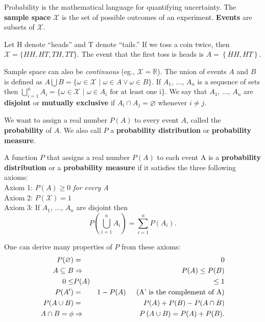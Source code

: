 Probability is the mathematical language for quantifying uncertainty. The {\bf sample space} $\mathcal{X}$ is the set of possible outcomes of an experiment. {\bf Events} are subsets of $\mathcal{X}$.

\begin{example}
 Let H denote ``heads'' and T denote ``tails.'' If we toss a coin twice, then $\mathcal{X}=\{ HH, HT, TH, TT\}$. The event that the first toss is heads is $A= \left\{HH, HT \right\}$.
\end{example}

Sample space can also be {\em continuous} (eg., $\mathcal{X}= \mathbb{R}$). The union of events $A$ and $B$ is defined as $A \bigcup B = \{ \omega \in \mathcal{X}\,\,|\,\, \omega \in A \vee \omega \in B\}$. If $A_1$, $\ldots$, $A_n$  is a sequence of sets then $\bigcup\limits_{i=1}^{n}A_{i} = \{ \omega \in \mathcal{X}\,\,|\,\, \omega \in A_{i} \text{ for at least one i}\}$. We say that  $A_1$, $\ldots$, $A_n$ are {\bf disjoint} or {\bf mutually exclusive} if $A_{i} \cap A_{j} = \varnothing$ whenever $i \neq j$.

\vspace{0.1in}
We want to assign a real number $P(A)$  to every event $A$, called the {\bf probability} of $A$. We also call $P$ a {\bf probability distribution} or {\bf probability measure}.

\bigskip

\fbox
{\begin{minipage}[h]{0.9\linewidth} 
\begin{definition}
A function $P$ that assigns a real number $P(A)$ to each event A is a {\bf probability distribution} or a {\bf probability measure} if it satisfies the three following axioms: \\

Axiom 1: $P(A) \geq 0$ {\em for every A} \\
Axiom 2: $P(\mathcal{X}) = 1$ \\
Axiom 3: If  $A_1$, $\ldots$, $A_n$ are disjoint then 
\begin{equation*}
P\left(\bigcup\limits_{i=1}^{n} A_{i}\right) = \sum\limits_{i=1}^{n} P(A_{i}).
\end{equation*}
\end{definition}
\end{minipage}}

\vspace{0.1in}
One can derive many properties of $P$ from these axioms:
\begin{eqnarray*}
P(\varnothing) &= &0 \\
A \subseteq B &\Rightarrow &P(A) \leq P(B) \\
0 \leq &P(A) &\leq 1 \\
P(A') &= &1 - P(A) \hspace{0.2in}(\text{A' is the complement of A}) \\
P(A \cup B) &=& P(A) + P(B) - P(A \cap B) \\
A \cap B = \phi &\Rightarrow &P\left( A \cup B\right) = P(A) + P(B).
\end{eqnarray*}

